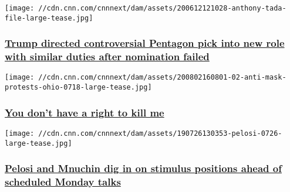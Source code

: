 \texttt{[image: //cdn.cnn.com/cnnnext/dam/assets/200612121028-anthony-tada-file-large-tease.jpg]}

\hypertarget{trump-directed-controversial-pentagon-pick-into-new-role-with-similar-duties-after-nomination-failed}{%
\subsubsection{\texorpdfstring{\href{/2020/08/02/politics/anthony-tata-nominee-pentagon/index.html}{Trump
directed controversial Pentagon pick into new role with similar duties
after nomination
failed}}{Trump directed controversial Pentagon pick into new role with similar duties after nomination failed}}\label{trump-directed-controversial-pentagon-pick-into-new-role-with-similar-duties-after-nomination-failed}}

\href{/2020/08/02/opinions/masks-whining-protesters-trump-obeidallah/index.html}{}

\texttt{[image: //cdn.cnn.com/cnnnext/dam/assets/200802160801-02-anti-mask-protests-ohio-0718-large-tease.jpg]}

\hypertarget{you-dont-have-a-right-to-kill-me}{%
\subsubsection{\texorpdfstring{\href{/2020/08/02/opinions/masks-whining-protesters-trump-obeidallah/index.html}{You
don't have a right to kill
me}}{You don't have a right to kill me}}\label{you-dont-have-a-right-to-kill-me}}

\href{/2020/08/02/politics/stimulus-negotiations-pelosi-mnuchin-coronavirus/index.html}{}

\texttt{[image: //cdn.cnn.com/cnnnext/dam/assets/190726130353-pelosi-0726-large-tease.jpg]}

\hypertarget{pelosi-and-mnuchin-dig-in-on-stimulus-positions-ahead-of-scheduled-monday-talks}{%
\subsubsection{\texorpdfstring{\href{/2020/08/02/politics/stimulus-negotiations-pelosi-mnuchin-coronavirus/index.html}{Pelosi
and Mnuchin dig in on stimulus positions ahead of scheduled Monday
talks}}{Pelosi and Mnuchin dig in on stimulus positions ahead of scheduled Monday talks}}\label{pelosi-and-mnuchin-dig-in-on-stimulus-positions-ahead-of-scheduled-monday-talks}}

\href{/2020/08/02/opinions/trump-bizarre-suggestion-opinion-column-galant/index.html}{}

